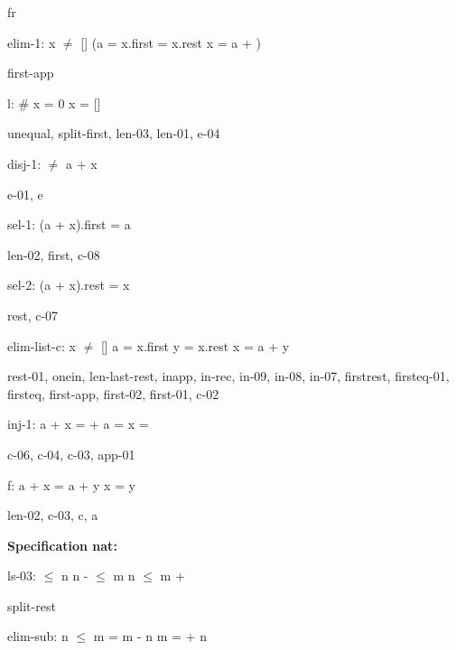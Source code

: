 \documentclass[a4paper]{article}
\begin{document}
fr

\bigskip

elim-1: 
 \Fol x $\neq$ [] \Imp (a = x.first \And {} = x.rest \Equiv x = a + )



first-app

\bigskip

l: 
 \Fol \# x = 0 \Equiv x = []



unequal, split-first, len-03, len-01, e-04

\bigskip

disj-1: 
 \Fol [] $\neq$ a + x



e-01, e

\bigskip

sel-1: 
 \Fol (a + x).first = a



len-02, first, c-08

\bigskip

sel-2: 
 \Fol (a + x).rest = x



rest, c-07

\bigskip

elim-list-c: 
x $\neq$ []
 \Fol a = x.first \And y = x.rest \Equiv x = a + y



rest-01, onein, len-last-rest, inapp, in-rec, in-09, in-08, in-07, firstrest, firsteq-01, firsteq, first-app, first-02, first-01, c-02

\bigskip

inj-1: 
 \Fol a + x =  +  \Equiv a =  \And x = 



c-06, c-04, c-03, app-01

\bigskip

f: 
 \Fol a + x = a + y \Equiv x = y



len-02, c-03, c, a

\bigskip

{\bf Specification nat:}

ls-03: 
 $\le$ n
 \Fol n -  $\le$ m \Equiv n $\le$ m + 



split-rest

\bigskip

elim-sub: 
n $\le$ m
 \Fol {} = m - n \Equiv m =  + n
\end{document}
